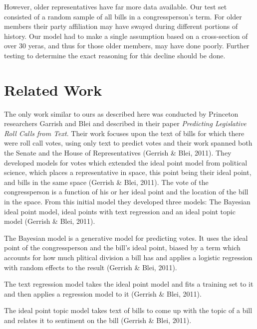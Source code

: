 \documentclass[11pt,letterpaper,twocolumn]{article}
\begin{document}
However, older representatives have far more data available. Our test set consisted of a random sample of all bills in a congressperson's term. For older members their party affiliation may have swayed during different portions of history. Our model had to make a single assumption based on a cross-section of over 30 yeras, and thus for those older members, may have done poorly. Further testing to determine the exact reasoning for this decline should be done.



\section{Related Work}

The only work similar to ours as described here was conducted by Princeton researchers Garrish and Blei and described in their paper \textit{Predicting Legislative Roll Calls from Text}. Their work focuses upon the text of bills for which there were roll call votes, using only text to predict votes and their work spanned both the Senate and the House of Representatives (Gerrish \& Blei, 2011). They developed models for votes which extended the ideal point model from political science, which places a representative in space, this point being their ideal point, and bills in the same space (Gerrish \& Blei, 2011). The vote of the congressperson is a function of his or her ideal point and the location of the bill in the space. From this initial model they developed three models: The Bayesian ideal point model, ideal points with text regression and an ideal point topic model (Gerrish \& Blei, 2011). 

The Bayesian model is a generative model for predicting votes. It uses the ideal point of the congressperson and the bill's ideal point, biased by a term which accounts for how much plitical division a bill has and applies a logistic regression with random effects to the result (Gerrish \& Blei, 2011). 

The text regression model takes the ideal point model and fits a training set to it and then applies a regression model to it (Gerrish \& Blei, 2011).

The ideal point topic model takes text of bills to come up with the topic of a bill and relates it to sentiment on the bill (Gerrish \& Blei, 2011).
\end{document}
